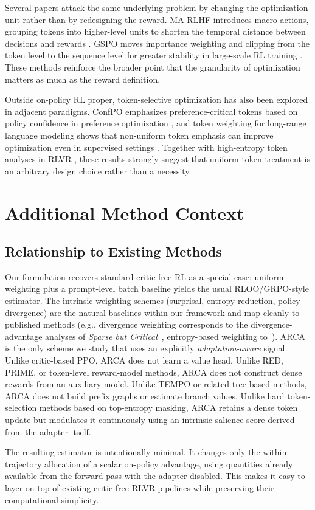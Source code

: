 Several papers attack the same underlying problem by changing the optimization unit
rather than by redesigning the reward. MA-RLHF introduces macro actions, grouping tokens
into higher-level units to shorten the temporal distance between decisions and rewards
\cite{chai2025marlhf}. GSPO moves importance weighting and clipping from the token level
to the sequence level for greater stability in large-scale RL training
\cite{zheng2025gspo}. These methods reinforce the broader point that the granularity of
optimization matters as much as the reward definition.

Outside on-policy RL proper, token-selective optimization has also been explored in
adjacent paradigms. ConfPO emphasizes preference-critical tokens based on policy
confidence in preference optimization \cite{yoon2025confpo}, and token weighting for
long-range language modeling shows that non-uniform token emphasis can improve
optimization even in supervised settings \cite{helm2025tokenweighting}. Together with
high-entropy token analyses in RLVR \cite{wang2025beyond8020}, these results strongly
suggest that uniform token treatment is an arbitrary design choice rather than a
necessity.

\section{Additional Method Context}\label{app:method-context}

\subsection{Relationship to Existing Methods}

Our formulation recovers standard critic-free RL as a special case: uniform
weighting plus a prompt-level batch baseline yields the usual RLOO/GRPO-style
estimator. The intrinsic weighting schemes (surprisal, entropy reduction,
policy divergence) are the natural baselines within our framework and map
cleanly to published methods (e.g., divergence weighting corresponds to the
divergence-advantage analyses of \emph{Sparse but
Critical}~\cite{meng2026sparsebutcritical}, entropy-based weighting
to~\cite{he2026eapo,yu2026erpo}). ARCA is the only scheme we
study that uses an explicitly \emph{adaptation-aware} signal. Unlike
critic-based PPO, ARCA does not learn a value head. Unlike RED, PRIME, or
token-level reward-model methods, ARCA does not construct dense rewards from
an auxiliary model. Unlike TEMPO or related tree-based methods, ARCA does not
build prefix graphs or estimate branch values. Unlike hard token-selection
methods based on top-entropy masking, ARCA retains a dense token update but
modulates it continuously using an intrinsic salience score derived from the
adapter itself.

The resulting estimator is intentionally minimal. It changes only the
within-trajectory allocation of a scalar on-policy advantage, using
quantities already available from the forward pass with the adapter disabled.
This makes it easy to layer on top of existing critic-free RLVR pipelines
while preserving their computational simplicity.
